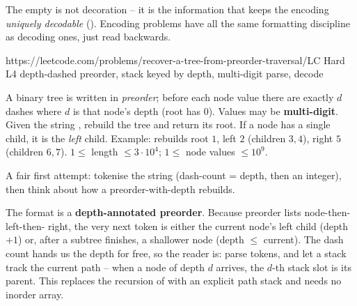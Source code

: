 \begin{insightbox}
The empty \code{()} is not decoration -- it is the information that keeps the encoding
\emph{uniquely decodable} (). Encoding problems have all the same
formatting discipline as decoding ones, just read backwards.
\end{insightbox}

  {https://leetcode.com/problems/recover-a-tree-from-preorder-traversal/}{LC Hard L4}
  {depth-dashed preorder, stack keyed by depth, multi-digit parse, decode}

\begin{problemstatement}
A binary tree is written in \emph{preorder}; before each node value there are exactly $d$
dashes \code{-} where $d$ is that node's depth (root has $0$). Values may be
\textbf{multi-digit}. Given the string , rebuild the tree and return its root.
If a node has a single child, it is the \emph{left} child. Example: 
rebuilds root $1$, left $2$ (children $3,4$), right $5$ (children $6,7$). $1 \le$
length $\le 3\cdot10^4$; $1 \le$ node values $\le 10^9$.
\end{problemstatement}

\begin{attemptgate}
A fair first attempt: tokenise the string (dash-count = depth, then an integer), then think
about how a preorder-with-depth rebuilds.
\end{attemptgate}

The format is a \textbf{depth-annotated preorder}. Because preorder lists node-then-left-then-
right, the very next token is either the current node's left child (depth $+1$) or, after a
subtree finishes, a shallower node (depth $\le$ current). The dash count hands us the depth for
free, so the reader is: parse tokens, and let a stack track the current path -- when a node of
depth $d$ arrives, the $d$-th stack slot is its parent. This replaces the recursion of
 with an explicit path stack and needs no inorder array.


